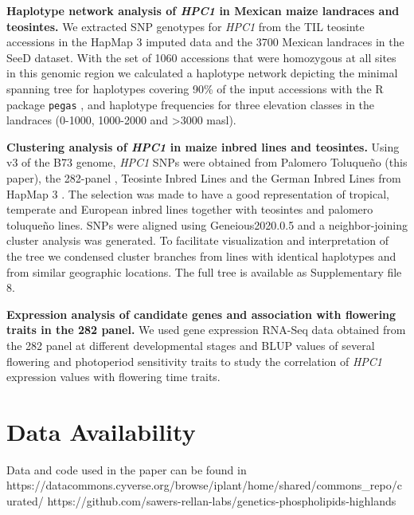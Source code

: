 \documentclass[9pt,twocolumn,twoside,lineno]{BioRxiv}
\def\code#1{\texttt{#1}}
\begin{document}
\textbf{Haplotype network analysis of \textit{HPC1} in Mexican maize landraces and teosintes.}
We extracted SNP genotypes for \textit{HPC1} from the TIL teosinte accessions in the HapMap 3 imputed data \cite{Bukowski2017-ng} and the 3700 Mexican landraces in the SeeD dataset. 
With the set of 1060 accessions that were homozygous at all sites in this genomic region we calculated a haplotype network depicting the minimal spanning tree for haplotypes covering 90\% of the input accessions with the R package \code{pegas} \cite{paradis2010}, and haplotype frequencies for three elevation classes in the landraces (0-1000, 1000-2000 and >3000 masl).

\textbf{Clustering analysis of \textit{HPC1} in maize inbred lines and teosintes.}
Using v3 of the B73 genome, \textit{HPC1} SNPs were obtained from Palomero Toluqueño (this paper), the 282-panel \cite{Flint-Garcia2005-hb}, Teosinte Inbred Lines and the German Inbred Lines from HapMap 3 \cite{Bukowski2017-ng}. 
The selection was made to have a good representation of tropical, temperate and European inbred lines together with teosintes and palomero toluqueño lines.
SNPs were aligned using Geneious2020.0.5 and a neighbor-joining cluster analysis was generated. 
To facilitate visualization and interpretation of the tree we condensed cluster branches from lines with identical haplotypes and from similar geographic locations. 
The full tree is available as Supplementary file 8. 

\textbf{Expression analysis of candidate genes and association with flowering traits in the 282 panel.}
We used gene expression RNA-Seq data obtained from the 282 panel at different developmental stages \cite{Kremling2018-gn} and BLUP values of several flowering and photoperiod sensitivity traits \cite{Hung2012-ms} to study the correlation of \textit{HPC1} expression values with flowering time traits.  

\section{Data Availability}
Data and code used in the paper can be found in 
https://datacommons.cyverse.org/browse/iplant/home/shared/commons_repo/curated/
https://github.com/sawers-rellan-labs/genetics-phospholipids-highlands
\end{document}
